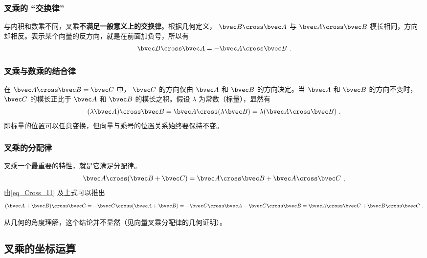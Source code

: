 \subsubsection{叉乘的 “交换律”}
与内积和数乘不同，叉乘\textbf{不满足一般意义上的交换律}。根据几何定义， $\bvec B \cross \bvec A$ 与 $\bvec A \cross \bvec B$ 模长相同，方向却相反。表示某个向量的反方向，就是在前面加负号，所以有
\begin{equation}\label{eq_Cross_11}
\bvec B \cross \bvec A = -\bvec A \cross \bvec B~.
\end{equation}

\subsubsection{叉乘与数乘的结合律}

在 $\bvec A \cross \bvec B = \bvec C$ 中， $\bvec C$ 的方向仅由 $\bvec A$ 和 $\bvec B$ 的方向决定。当 $\bvec A$ 和 $\bvec B$ 的方向不变时， $\bvec C$ 的模长正比于 $\bvec A$ 和 $\bvec B$ 的模长之积。假设 $\lambda $ 为常数（标量），显然有
\begin{equation}
(\lambda \bvec A) \cross \bvec B = \bvec A \cross (\lambda \bvec B) = \lambda (\bvec A \cross \bvec B)~.
\end{equation}
即标量的位置可以任意变换，但向量与乘号的位置关系始终要保持不变。

\subsubsection{叉乘的分配律}

叉乘一个最重要的特性，就是它满足分配律。
\begin{equation}\label{eq_Cross_6}
\bvec A \cross (\bvec B +\bvec C) = \bvec A \cross \bvec B + \bvec A \cross \bvec C~,
\end{equation}
由\autoref{eq_Cross_11} 及上式可以推出
\begin{equation}\label{eq_Cross_7}
(\bvec A + \bvec B) \cross \bvec C =  - \bvec C \cross (\bvec A + \bvec B) =  - \bvec C \cross \bvec A - \bvec C \cross \bvec B = \bvec A \cross \bvec C + \bvec B \cross \bvec C~.
\end{equation}

从几何的角度理解，这个结论并不显然（见向量叉乘分配律的几何证明）。

\subsection{叉乘的坐标运算}
